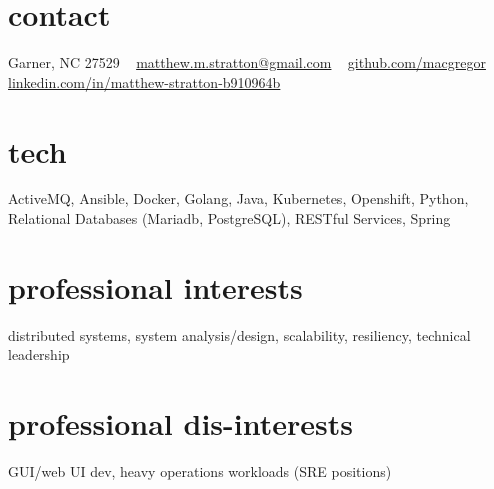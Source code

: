 
\begin{aside_p1} %
\section{contact}
Garner, NC 27529
~
\href{mailto:matthew.m.stratton@gmail.com}{\small{matthew.m.stratton@gmail.com}}
~
\href{https://github.com/macgregor}{github.com/macgregor}
~
\href{https://www.linkedin.com/in/matthew-stratton-b910964b}{\small{linkedin.com/in/matthew-stratton-b910964b}}
\section{tech}
ActiveMQ, Ansible, Docker, Golang, Java, Kubernetes, Openshift, Python, Relational Databases (Mariadb, PostgreSQL), RESTful Services, Spring
\section{professional interests}
distributed systems, system analysis/design, scalability, resiliency, technical leadership
~
\section{professional dis-interests}
GUI/web UI dev, heavy operations workloads (SRE positions)
\end{aside_p1}
